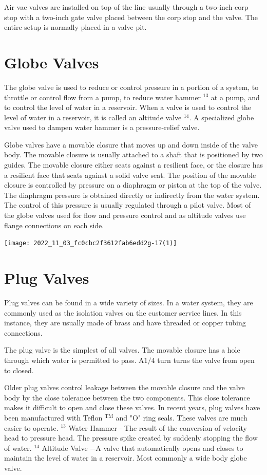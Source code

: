\documentclass[10pt]{article}
\begin{document}
Air vac valves are installed on top of the line usually through a two-inch corp stop with a two-inch gate valve placed between the corp stop and the valve. The entire setup is normally placed in a valve pit.

\section{Globe Valves}
The globe valve is used to reduce or control pressure in a portion of a system, to throttle or control flow from a pump, to reduce water hammer ${ }^{13}$ at a pump, and to control the level of water in a reservoir. When a valve is used to control the level of water in a reservoir, it is called an altitude valve ${ }^{14}$. A specialized globe valve used to dampen water hammer is a pressure-relief valve.

Globe valves have a movable closure that moves up and down inside of the valve body. The movable closure is usually attached to a shaft that is positioned by two guides. The movable closure either seats against a resilient face, or the closure has a resilient face that seats against a solid valve seat. The position of the movable closure is controlled by pressure on a diaphragm or piston at the top of the valve. The diaphragm pressure is obtained directly or indirectly from the water system. The control of this pressure is usually regulated through a pilot valve. Most of the globe valves used for flow and pressure control and as altitude valves use flange connections on each side.

\texttt{[image: 2022\_11\_03\_fc0cbc2f3612fab6edd2g-17(1)]}

\section{Plug Valves}
Plug valves can be found in a wide variety of sizes. In a water system, they are commonly used as the isolation valves on the customer service lines. In this instance, they are usually made of brass and have threaded or copper tubing connections.

The plug valve is the simplest of all valves. The movable closure has a hole through which water is permitted to pass. $\mathrm{A} 1 / 4$ turn turns the valve from open to closed.

Older plug valves control leakage between the movable closure and the valve body by the close tolerance between the two components. This close tolerance makes it difficult to open and close these valves. In recent years, plug valves have been manufactured with Teflon ${ }^{\mathrm{TM}}$ and "O" ring seals. These valves are much easier to operate. ${ }^{13}$ Water Hammer - The result of the conversion of velocity head to pressure head. The pressure spike created by suddenly stopping the flow of water. ${ }^{14}$ Altitude Valve $-\mathrm{A}$ valve that automatically opens and closes to maintain the level of water in a reservoir. Most commonly a wide body globe valve.\\
\end{document}
